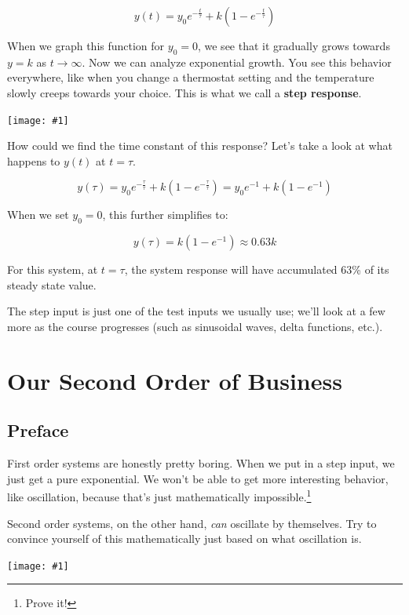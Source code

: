 \documentclass{report}
\newcommand{\bicture}[1]{
\begin{center}
    {\texttt{[image: \#1]}}
\end{center}}
\begin{document}
\begin{onehalfspacing}
\begin{flushleft}
\vspace{-0.1in}
\[y(t) = y_0 e^{-\frac{t}{\tau}} + k(1-e^{-\frac{t}{\tau}})\]

When we graph this function for \(y_0 = 0\), we see that it gradually grows towards \(y=k\) as \(t\to\infty\). Now we can analyze exponential growth. You see this behavior everywhere, like when you change a thermostat setting and the temperature slowly creeps towards your choice. This is what we call a \textbf{step response}.

\bicture{2_step}

How could we find the time constant of this response? Let's take a look at what happens to \(y(t)\) at \(t=\tau\).

\vspace{-0.1in}
\[y(\tau) = y_0 e^{-\frac{\tau}{\tau}} + k(1-e^{-\frac{\tau}{\tau}})= y_0 e^{-1} + k(1-e^{-1})\]

When we set \(y_0 = 0\), this further simplifies to:

\vspace{-0.1in}
\[y(\tau) = k(1-e^{-1}) \approx 0.63 k\]

For this system, at \(t=\tau\), the system response will have accumulated 63\% of its steady state value.

\medskip

The step input is just one of the test inputs we usually use; we'll look at a few more as the course progresses (such as sinusoidal waves, delta functions, etc.).

\chapter{Our Second Order of Business}

\section*{Preface}

First order systems are honestly pretty boring. When we put in a step input, we just get a pure exponential. We won't be able to get more interesting behavior, like oscillation, because that's just mathematically impossible.\footnote{Prove it!}

\medskip

Second order systems, on the other hand, \textit{can} oscillate by themselves. Try to convince yourself of this mathematically just based on what oscillation is.

\bicture{2_unf}


\end{flushleft}
\end{onehalfspacing}
\end{document}
